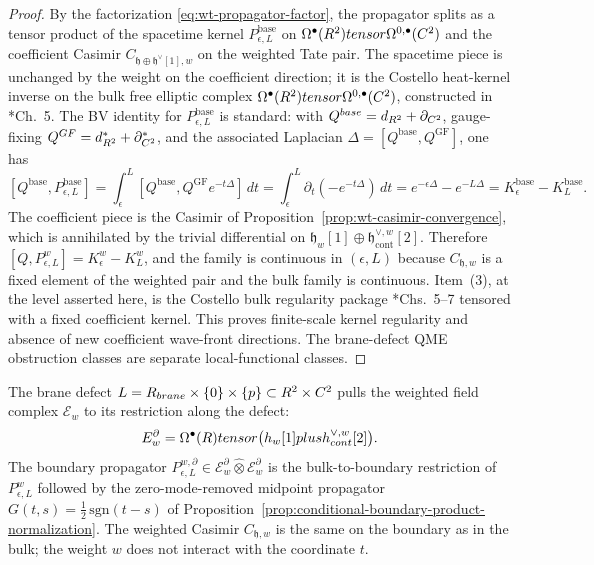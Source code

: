 \begin{proof}
  By the factorization \eqref{eq:wt-propagator-factor}, the
  propagator splits as a tensor product of the spacetime kernel
  $P_{\epsilon,L}^{\mathrm{base}}$ on
  $\Omega^\bullet(R^2)tensor\Omega^{0,\bullet}(C^2)$ and
  the coefficient Casimir $C_{\mathfrak h\oplus\mathfrak h^\vee[1],w}$
  on the weighted Tate pair. The spacetime piece is unchanged by the
  weight on the coefficient direction; it is the Costello heat-kernel
  inverse on the bulk free elliptic complex
  $\Omega^\bullet(R^2)tensor\Omega^{0,\bullet}(C^2)$,
  constructed in \cite{costello-renormalization}*{Ch.~5}. The BV
  identity for $P_{\epsilon,L}^{\mathrm{base}}$ is standard: with
  $Q^{base}=d_{R^2}+\partial_{C^2}$, gauge-fixing
  $Q^{GF}=d_{R^2}^*+\partial_{C^2}^*$, and the
  associated Laplacian $\Delta=[Q^{\mathrm{base}},Q^{\mathrm{GF}}]$,
  one has
  $$[Q^{\mathrm{base}},P_{\epsilon,L}^{\mathrm{base}}]
    =\int_\epsilon^L[Q^{\mathrm{base}},Q^{\mathrm{GF}}e^{-t\Delta}]\,dt
    =\int_\epsilon^L\partial_t(-e^{-t\Delta})\,dt
    =e^{-\epsilon\Delta}-e^{-L\Delta}=K_\epsilon^{\mathrm{base}}
    -K_L^{\mathrm{base}}.$$
  The coefficient piece is the Casimir of
  Proposition~\ref{prop:wt-casimir-convergence}, which is annihilated
  by the trivial differential on
  $\mathfrak h_w[1]\oplus\mathfrak h^{\vee,w}_{\mathrm{cont}}[2]$.
  Therefore
  $[Q,P_{\epsilon,L}^{w}]=K_\epsilon^{w}-K_L^{w}$, and the family is
  continuous in $(\epsilon,L)$ because $C_{\mathfrak h,w}$ is a fixed
  element of the weighted pair and the bulk family is continuous.
  Item~(3), at the level asserted here, is the Costello bulk
  regularity package \cite{costello-renormalization}*{Chs.~5--7}
  tensored with a fixed coefficient kernel. This proves finite-scale
  kernel regularity and absence of new coefficient wave-front
  directions. The brane-defect QME obstruction classes are separate
  local-functional classes.
\end{proof}

\begin{rmk}\label{rmk:wt-brane-defect}
  The brane defect
  \(L=R_{brane}\times\{0\}\times\{p\}
  \subset R^2\times C^2\) pulls the
  weighted field complex $\mathcal E_w$ to its restriction along the
  defect:
  $$E_w^{\partial}=\Omega^\bullet(R)tensor\bigl(
    h_w[1]plush^{\vee,w}_{cont}[2]\bigr).$$
  The boundary propagator
  $P_{\epsilon,L}^{w,\partial}\in\mathcal E_w^\partial\widehat\otimes
  \mathcal E_w^\partial$ is the bulk-to-boundary restriction of
  $P_{\epsilon,L}^{w}$ followed by the zero-mode-removed midpoint
  propagator $G(t,s)=\frac12\,\mathrm{sgn}(t-s)$ of
  Proposition~\ref{prop:conditional-boundary-product-normalization}.
  The weighted Casimir $C_{\mathfrak h,w}$ is the same on the boundary
  as in the bulk; the weight $w$ does not interact with the
  coordinate $t$.
\end{rmk}

